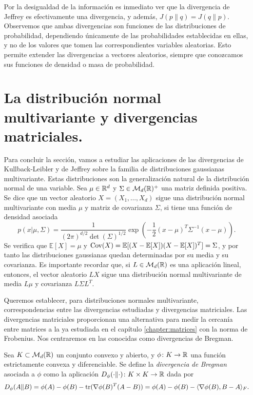 Por la desigualdad de la información es inmediato ver que la divergencia de Jeffrey es efectivamente una divergencia, y además, $J(p\|q) = J(q\|p)$. Observemos que ambas divergencias son funciones de las distribuciones de probabilidad, dependiendo únicamente de las probabilidades establecidas en ellas, y no de los valores que tomen las correspondientes variables aleatorias. Esto permite extender las divergencias a vectores aleatorios, siempre que conozcamos sus funciones de densidad o masa de probabilidad.

\section{La distribución normal multivariante y divergencias matriciales.}

Para concluir la sección, vamos a estudiar las aplicaciones de las divergencias de Kullback-Leibler y de Jeffrey sobre la familia de distribuciones gaussianas multivariante. Estas distribuciones son la generalización natural de la distribución normal de una variable. Sea $\mu \in \mathbb{R}^d$ y $\Sigma \in \mathcal{M}_d(\mathbb{R})^+$ una matriz definida positiva. Se dice que un vector aleatorio $X = (X_1,\dots,X_d)$ sigue una distribución normal multivariante con media $\mu$ y matriz de covarianza $\Sigma$, si tiene una función de densidad asociada
\[ p(x|\mu,\Sigma) = \frac{1}{(2\pi)^{d/2} \det(\Sigma)^{1/2}} \exp\left(-\frac{1}{2} (x-\mu)^T\Sigma^{-1}(x-\mu)\right). \]
Se verifica que $\mathbb{E}[X] = \mu$ y $\operatorname{Cov}(X) = \mathbb{E}[(X-\mathbb{E}[X])(X - \mathbb{E}[X])^T] = \Sigma$, y por tanto las distribuciones gaussianas quedan determinadas por su media y su covarianza. Es importante recordar que, si $L \in \mathcal{M}_d(\mathbb{R})$ es una aplicación lineal, entonces, el vector aleatorio $LX$ sigue una distribución normal multivariante de media $L\mu$ y covarianza $L\Sigma L^T$.

Queremos establecer, para distribuciones normales multivariante, correspondencias entre las divergencias estudiadas y divergencias matriciales. Las divergencias matriciales proporcionan una alternativa para medir la cercanía entre matrices a la ya estudiada en el capítulo \ref{chapter:matrices} con la norma de Frobenius. Nos centraremos en las conocidas como divergencias de Bregman.

\begin{definition}
    Sea $K \subset \mathcal{M}_d(\mathbb{R})$ un conjunto convexo y abierto, y $\phi \colon K \to \mathbb{R}$ una función estrictamente convexa y diferenciable. Se define la \emph{divergencia de Bregman} asociada a $\phi$ como la aplicación $D_{\phi}(\cdot \| \cdot) \colon K \times K \to \mathbb{R}$ dada por
    \[ D_{\phi}(A\|B) = \phi(A) - \phi(B) - \operatorname{tr}(\nabla\phi(B)^T(A-B)) = \phi(A) - \phi(B) - \langle \nabla\phi(B), B-A\rangle_F.\]
\end{definition}


